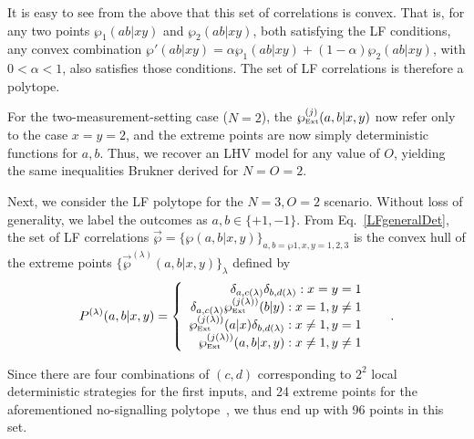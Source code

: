 \documentclass[aps,prx,twocolumn,superscriptaddress]{revtex4-1}
\theoremstyle{plain}
\newcommand{\vecP}{\vec{\wp}}
\newcommand{\Pext}{\wp_\text{\tiny Ext}}
\begin{document}
It is easy to see from the above that this set of correlations is convex. That is, for any two points $\wp_1(ab|xy)$ and $\wp_2(ab|xy)$, both satisfying the LF conditions, any convex combination $\wp'(ab|xy)=\alpha \wp_1(ab|xy)+(1-\alpha)\wp_2(ab|xy)$, with $0<\alpha<1$, also satisfies those conditions. The set of LF correlations is therefore a polytope.

For the two-measurement-setting case ($N=2$), the $\Pext^{(j)}(a,b|x,y)$ now refer only to the case $x=y=2$, and the extreme points are now simply deterministic functions for $a,b$. Thus, we recover an LHV model for any value of $O$, yielding the same inequalities Brukner derived for $N=O=2$.

Next, we consider the LF polytope for the $N=3,O=2$ scenario. Without loss of generality, we label the outcomes as $a,b \in \{+1,-1\}$. From Eq.~\eqref{LFgeneralDet}, the set of LF correlations $\vecP = \{\wp(a,b|x,y)\}_{a,b=\wp1,x,y=1,2,3}$ is the convex hull of the extreme points $\{\vecP^{(\lambda)}(a,b|x,y)\}_\lambda$ defined by
\begin{equation}
	P^{(\lambda)}(a,b|x,y) = 
	\left\{\begin{array}{r@{\quad \quad}}
		\delta_{a,c(\lambda)}\delta_{b,d(\lambda)}: x=y=1 \\
		\delta_{a,c(\lambda)}\Pext^{(j(\lambda))}(b|y): x=1,y\neq 1 \\
		\Pext^{(j(\lambda))}(a|x)\delta_{b,d(\lambda)}: x\neq 1,y= 1 \\
		\Pext^{(j(\lambda))}(a,b|x,y): x\neq 1,y\neq 1
		 \end{array}\right. .
\end{equation} 

Since there are four combinations of $(c,d)$ corresponding to $2^2$ local deterministic strategies for the first inputs, and 24 extreme points for the aforementioned no-signalling polytope~\cite{Barrett05}, we thus end up with 96 points in this set.
\end{document}
